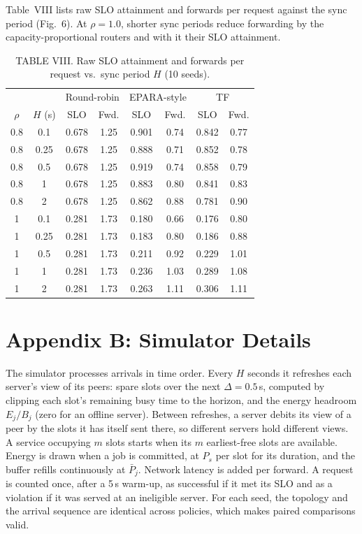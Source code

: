 \documentclass{article}
\begin{document}
Table~VIII lists raw SLO attainment and forwards per request against the sync period (Fig.~6). At $\rho=1.0$, shorter sync periods reduce forwarding by the capacity-proportional routers and with it their SLO attainment.

\begin{table}[h]

\caption{TABLE VIII. Raw SLO attainment and forwards per request vs.\ sync period $H$ (10 seeds).}\label{tab:stalefull}
\begin{tabular}{cc|cc|cc|cc}
\toprule
 & & \multicolumn{2}{c|}{Round-robin} & \multicolumn{2}{c|}{EPARA-style} & \multicolumn{2}{c}{TF}\\
$\rho$ & $H$ (s) & SLO & Fwd. & SLO & Fwd. & SLO & Fwd.\\
\midrule
0.8 & 0.1 & 0.678 & 1.25 & 0.901 & 0.74 & 0.842 & 0.77 \\
0.8 & 0.25 & 0.678 & 1.25 & 0.888 & 0.71 & 0.852 & 0.78 \\
0.8 & 0.5 & 0.678 & 1.25 & 0.919 & 0.74 & 0.858 & 0.79 \\
0.8 & 1 & 0.678 & 1.25 & 0.883 & 0.80 & 0.841 & 0.83 \\
0.8 & 2 & 0.678 & 1.25 & 0.862 & 0.88 & 0.781 & 0.90 \\
\midrule
1 & 0.1 & 0.281 & 1.73 & 0.180 & 0.66 & 0.176 & 0.80 \\
1 & 0.25 & 0.281 & 1.73 & 0.183 & 0.80 & 0.186 & 0.88 \\
1 & 0.5 & 0.281 & 1.73 & 0.211 & 0.92 & 0.229 & 1.01 \\
1 & 1 & 0.281 & 1.73 & 0.236 & 1.03 & 0.289 & 1.08 \\
1 & 2 & 0.281 & 1.73 & 0.263 & 1.11 & 0.306 & 1.11 \\
\bottomrule
\end{tabular}

\end{table}

\section*{Appendix B: Simulator Details}
The simulator processes arrivals in time order. Every $H$ seconds it refreshes each server's view of its peers: spare slots over the next $\Delta=0.5$\,s, computed by clipping each slot's remaining busy time to the horizon, and the energy headroom $E_j/B_j$ (zero for an offline server). Between refreshes, a server debits its view of a peer by the slots it has itself sent there, so different servers hold different views. A service occupying $m$ slots starts when its $m$ earliest-free slots are available. Energy is drawn when a job is committed, at $P_s$ per slot for its duration, and the buffer refills continuously at $\bar P_j$. Network latency is added per forward. A request is counted once, after a 5\,s warm-up, as successful if it met its SLO and as a violation if it was served at an ineligible server. For each seed, the topology and the arrival sequence are identical across policies, which makes paired comparisons valid.
\end{document}
